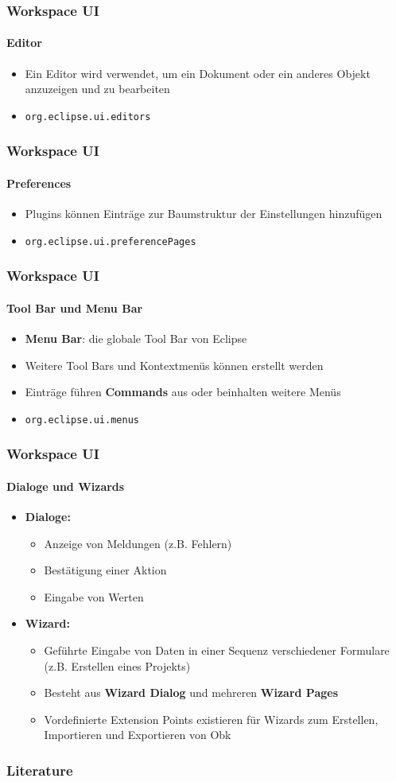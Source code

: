 {\begin{frame}
  \frametitle{Workspace UI}
  \framesubtitle{Editor}
  \begin{itemize}
    \item Ein Editor wird verwendet, um ein Dokument oder ein anderes Objekt anzuzeigen und zu bearbeiten
    \item \texttt{org.eclipse.ui.editors}
  \end{itemize}
\end{frame}

\begin{frame}
  \frametitle{Workspace UI}
  \framesubtitle{Preferences}
  \begin{itemize}
    \item Plugins können Einträge zur Baumstruktur der Einstellungen hinzufügen
    \item \texttt{org.eclipse.ui.preferencePages}
  \end{itemize}
\end{frame}

\begin{frame}
  \frametitle{Workspace UI}
  \framesubtitle{Tool Bar und Menu Bar}
  \begin{itemize}
    \item \textbf{Menu Bar}: die globale Tool Bar von Eclipse
    \item Weitere Tool Bars und Kontextmenüs können erstellt werden
    \item Einträge führen \textbf{Commands} aus oder beinhalten weitere Menüs
    \item \texttt{org.eclipse.ui.menus}
  \end{itemize}
\end{frame}

\begin{frame}
  \frametitle{Workspace UI}
  \framesubtitle{Dialoge und Wizards}
  \begin{itemize}
    \item \textbf{Dialoge:}
    \begin{itemize}
      \item Anzeige von Meldungen (z.B. Fehlern)
      \item Bestätigung einer Aktion
      \item Eingabe von Werten
    \end{itemize}
    \item \textbf{Wizard:}
    \begin{itemize}
      \item Geführte Eingabe von Daten in einer Sequenz verschiedener Formulare (z.B. Erstellen eines Projekts)
      \item Besteht aus \textbf{Wizard Dialog} und mehreren \textbf{Wizard Pages}
      \item Vordefinierte Extension Points existieren für Wizards zum Erstellen, Importieren und Exportieren von Obk
    \end{itemize}
  \end{itemize}
\end{frame}



\begin{frame}
\frametitle{Literature}

\end{frame}


}